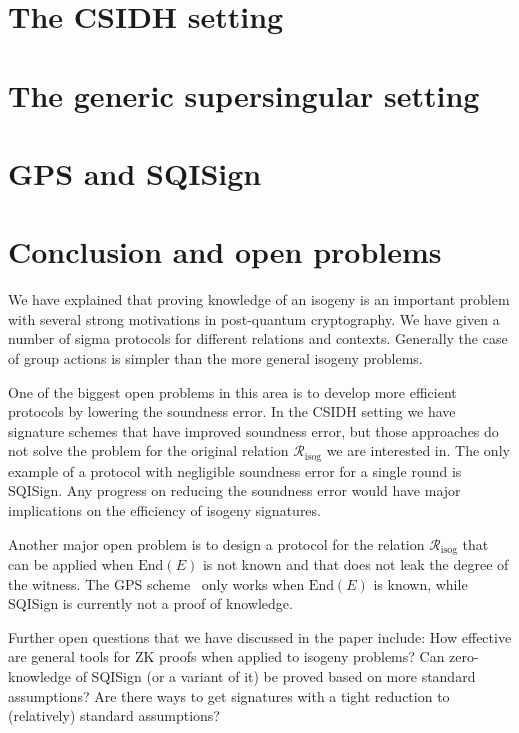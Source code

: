 \documentclass{llncs}
\newcommand{\R}[1][]{\ensuremath{\mathcal{R}_{\mathrm{#1}}}}
\newcommand{\End}{\text{End}}
\begin{document}






\section{The CSIDH setting\label{sec:CSIDH-setting}}






\section{The generic supersingular setting \label{sec:SIDH-setting}}





\section{GPS and SQISign\label{sec:GPSandSQIsign}}



\section{Conclusion and open problems\label{sec:conclusion}}

We have explained that proving knowledge of an isogeny is an important problem with several strong motivations in post-quantum cryptography.
%
We have given a number of sigma protocols for different relations and contexts. Generally the case of group actions is simpler than the more general isogeny problems.

One of the biggest open problems in this area is to develop more efficient protocols by lowering the soundness error.
In the CSIDH setting we have signature schemes that have improved soundness error, but those approaches do not solve the problem for the original relation $\R[isog]$ we are interested in.
The only example of a protocol with negligible soundness error for a single round is SQISign.
Any progress on reducing the soundness error would have major implications on the efficiency of isogeny signatures.

Another major open problem is to design a protocol for the relation $\R[isog]$ that can be applied when $\End(E)$ is not known and that does not leak the degree of the witness. The GPS scheme~\cite{GPS20} only works when $\End(E)$ is known, while SQISign is currently not a proof of knowledge.


Further open questions that we have discussed in the paper include:
How effective are general tools for ZK proofs when applied to isogeny problems?
Can zero-knowledge of SQISign (or a variant of it) be proved based on more standard assumptions?
Are there ways to get signatures with a tight reduction to (relatively) standard assumptions?




\end{document}
